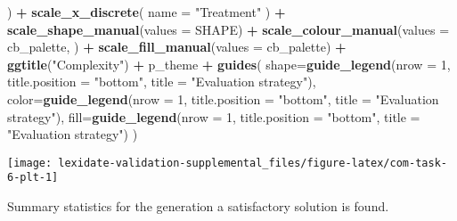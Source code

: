 \documentclass[
]{book}
\newenvironment{Shaded}{\begin{snugshade}}{\end{snugshade}}
\newcommand{\AttributeTok}[1]{\textcolor[rgb]{0.13,0.29,0.53}{#1}}
\newcommand{\DecValTok}[1]{\textcolor[rgb]{0.00,0.00,0.81}{#1}}
\newcommand{\FunctionTok}[1]{\textcolor[rgb]{0.13,0.29,0.53}{\textbf{#1}}}
\newcommand{\NormalTok}[1]{#1}
\newcommand{\SpecialCharTok}[1]{\textcolor[rgb]{0.81,0.36,0.00}{\textbf{#1}}}
\newcommand{\StringTok}[1]{\textcolor[rgb]{0.31,0.60,0.02}{#1}}
\begin{document}
\begin{Shaded}
\begin{Highlighting}[]
\NormalTok{  ) }\SpecialCharTok{+}
  \FunctionTok{scale\_x\_discrete}\NormalTok{(}
    \AttributeTok{name =} \StringTok{"Treatment"}
\NormalTok{  ) }\SpecialCharTok{+}
  \FunctionTok{scale\_shape\_manual}\NormalTok{(}\AttributeTok{values =}\NormalTok{ SHAPE) }\SpecialCharTok{+}
  \FunctionTok{scale\_colour\_manual}\NormalTok{(}\AttributeTok{values =}\NormalTok{ cb\_palette, ) }\SpecialCharTok{+}
  \FunctionTok{scale\_fill\_manual}\NormalTok{(}\AttributeTok{values =}\NormalTok{ cb\_palette) }\SpecialCharTok{+}
  \FunctionTok{ggtitle}\NormalTok{(}\StringTok{"Complexity"}\NormalTok{) }\SpecialCharTok{+}
\NormalTok{  p\_theme }\SpecialCharTok{+}
  \FunctionTok{guides}\NormalTok{(}
    \AttributeTok{shape=}\FunctionTok{guide\_legend}\NormalTok{(}\AttributeTok{nrow =} \DecValTok{1}\NormalTok{, }\AttributeTok{title.position =} \StringTok{"bottom"}\NormalTok{,}
                       \AttributeTok{title =} \StringTok{"Evaluation strategy"}\NormalTok{),}
    \AttributeTok{color=}\FunctionTok{guide\_legend}\NormalTok{(}\AttributeTok{nrow =} \DecValTok{1}\NormalTok{, }\AttributeTok{title.position =} \StringTok{"bottom"}\NormalTok{,}
                       \AttributeTok{title =} \StringTok{"Evaluation strategy"}\NormalTok{),}
    \AttributeTok{fill=}\FunctionTok{guide\_legend}\NormalTok{(}\AttributeTok{nrow =} \DecValTok{1}\NormalTok{, }\AttributeTok{title.position =} \StringTok{"bottom"}\NormalTok{,}
                      \AttributeTok{title =} \StringTok{"Evaluation strategy"}\NormalTok{)}
\NormalTok{  )}
\end{Highlighting}
\end{Shaded}

\texttt{[image: lexidate-validation-supplemental\_files/figure-latex/com-task-6-plt-1]}

Summary statistics for the generation a satisfactory solution is found.
\end{document}
